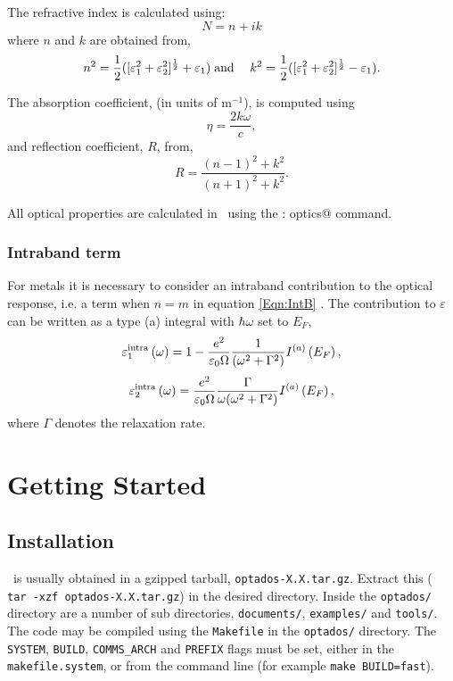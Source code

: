 \documentclass[a4paper,11pt,twoside]{book}
\begin{document}
{The refractive index is calculated using:
\begin{equation}
N=n+ik
\end{equation}
where $n$ and $k$ are obtained from,
\begin{eqnarray}
n^2=\frac{1}{2}([\varepsilon_1^2+\varepsilon_2^2]^{\frac{1}{2}}+\varepsilon_1)
& {\rm \;and\;}&
k^2=\frac{1}{2}([\varepsilon_1^2+\varepsilon_2^2]^{\frac{1}{2}}-\varepsilon_1).
\end{eqnarray}


The absorption coefficient, (in units of m$^{-1}$), is computed using
\begin{equation}
\eta = \frac{2k\omega}{c},
\end{equation}
and reflection coefficient, $R$, from,
\begin{equation}
R= \frac{(n-1)^2 + k^2}{(n+1)^2+k^2}.
\end{equation}

All optical properties are calculated in \optados\ using the \verb@task : optics@ command.

\subsection{Intraband term}
For metals it is necessary to consider an intraband contribution to
the optical response, i.e. a term when $n = m$ in equation
\ref{Eqn:IntB}  \cite{dressel,draxl}.  The contribution to
$\varepsilon$ can be written as a type (a) integral with $\hbar\omega$
set to $E_F$, 
\begin{equation}
\varepsilon_1^{\rm{intra}} \left ( \omega \right ) = 1 - \frac{e^2}{\varepsilon_0 \Omega} \frac{1}{(\omega^2+\Gamma^2)} I^{(a)}\left ( E_F \right ),
\end{equation}
\begin{equation}
\varepsilon_2^{\rm{intra}} \left ( \omega \right ) = \frac{e^2}{\varepsilon_0 \Omega}\frac{\Gamma}{\omega (\omega^2+\Gamma^2)} I^{(a)}\left ( E_F \right ),
\end{equation}
where $\Gamma$ denotes the relaxation rate.  



\chapter{Getting Started}\label{chap:getting_started}
\section{Installation}
\optados\ is usually obtained in a gzipped tarball, \verb#optados-X.X.tar.gz#. Extract this ( \verb# tar -xzf optados-X.X.tar.gz#) in the desired directory. Inside the  \verb#optados/# directory are a number of sub directories,  \verb#documents/#,   \verb#examples/# and \verb#tools/#.  The code may be compiled using the \verb#Makefile# in the  \verb#optados/# directory.  The \verb#SYSTEM#, \verb#BUILD#, \verb#COMMS_ARCH# and \verb#PREFIX# flags must be set, either in the  \verb#makefile.system#, or from the command line (for example  \verb#make BUILD=fast#).  

}
\end{document}
